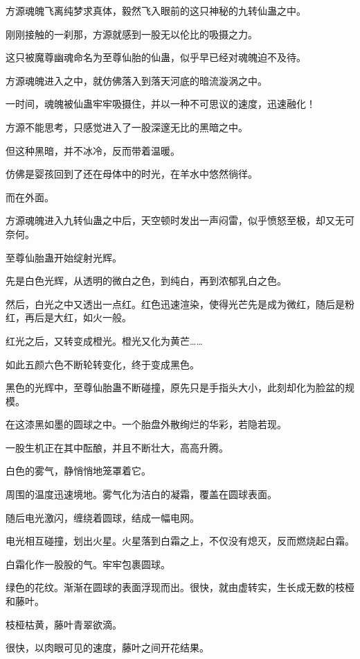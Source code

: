 
\begin{this_body}

方源魂魄飞离纯梦求真体，毅然飞入眼前的这只神秘的九转仙蛊之中。

刚刚接触的一刹那，方源就感到一股无以伦比的吸摄之力。

这只被魔尊幽魂命名为至尊仙胎的仙蛊，似乎早已经对魂魄迫不及待。

方源魂魄进入之中，就仿佛落入到落天河底的暗流漩涡之中。

一时间，魂魄被仙蛊牢牢吸摄住，并以一种不可思议的速度，迅速融化！

方源不能思考，只感觉进入了一股深邃无比的黑暗之中。

但这种黑暗，并不冰冷，反而带着温暖。

仿佛是婴孩回到了还在母体中的时光，在羊水中悠然徜徉。

而在外面。

方源魂魄进入九转仙蛊之中后，天空顿时发出一声闷雷，似乎愤怒至极，却又无可奈何。

至尊仙胎蛊开始绽射光辉。

先是白色光辉，从透明的微白之色，到纯白，再到浓郁乳白之色。

然后，白光之中又透出一点红。红色迅速渲染，使得光芒先是成为微红，随后是粉红，再后是大红，如火一般。

红光之后，又转变成橙光。橙光又化为黄芒……

如此五颜六色不断轮转变化，终于变成黑色。

黑色的光辉中，至尊仙胎蛊不断碰撞，原先只是手指头大小，此刻却化为脸盆的规模。

在这漆黑如墨的圆球之中。一个胎盘外散绚烂的华彩，若隐若现。

一股生机正在其中酝酿，并且不断壮大，高高升腾。

白色的雾气，静悄悄地笼罩着它。

周围的温度迅速境地。雾气化为洁白的凝霜，覆盖在圆球表面。

随后电光激闪，缠绕着圆球，结成一幅电网。

电光相互碰撞，划出火星。火星落到白霜之上，不仅没有熄灭，反而燃烧起白霜。

白霜化作一股股的气。牢牢包裹圆球。

绿色的花纹。渐渐在圆球的表面浮现而出。很快，就由虚转实，生长成无数的枝桠和藤叶。

枝桠枯黄，藤叶青翠欲滴。

很快，以肉眼可见的速度，藤叶之间开花结果。


\end{this_body}
